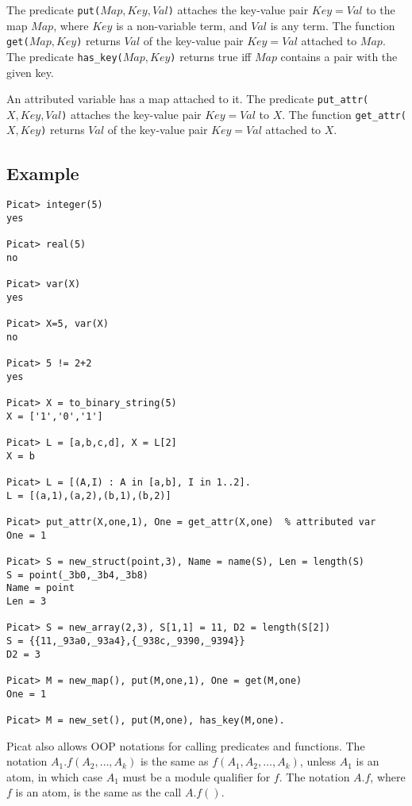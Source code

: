 The predicate \texttt{put($Map,Key,Val$)} attaches the key-value pair \texttt{$Key$$=$$Val$} to the map \texttt{$Map$}, where \texttt{$Key$} is a non-variable term, and \texttt{$Val$} is any term. The function \texttt{get($Map,Key$)} returns \texttt{$Val$} of the key-value pair \texttt{$Key$$=$$Val$} attached to \texttt{$Map$}. The predicate \texttt{has\_key($Map,Key$)} returns true iff $Map$ contains a pair with the given key.

An attributed variable has a map attached to it. The predicate \texttt{put\_attr($X,Key,Val$)} attaches the key-value pair \texttt{$Key$$=$$Val$} to \texttt{$X$}. The function \texttt{get\_attr($X,Key$)} returns \texttt{$Val$} of the key-value pair \texttt{$Key$$=$$Val$} attached to \texttt{$X$}. 

\subsection*{Example}
\begin{verbatim}
Picat> integer(5)
yes

Picat> real(5)
no

Picat> var(X)
yes

Picat> X=5, var(X)
no

Picat> 5 != 2+2
yes

Picat> X = to_binary_string(5)
X = ['1','0','1']

Picat> L = [a,b,c,d], X = L[2]
X = b

Picat> L = [(A,I) : A in [a,b], I in 1..2].
L = [(a,1),(a,2),(b,1),(b,2)]

Picat> put_attr(X,one,1), One = get_attr(X,one)  % attributed var
One = 1

Picat> S = new_struct(point,3), Name = name(S), Len = length(S)
S = point(_3b0,_3b4,_3b8)
Name = point
Len = 3

Picat> S = new_array(2,3), S[1,1] = 11, D2 = length(S[2])
S = {{11,_93a0,_93a4},{_938c,_9390,_9394}}
D2 = 3

Picat> M = new_map(), put(M,one,1), One = get(M,one)
One = 1

Picat> M = new_set(), put(M,one), has_key(M,one).
\end{verbatim}

Picat also allows OOP notations for calling predicates and functions. The notation \texttt{$A_1.f(A_2,\ldots,A_k)$} is the same as \texttt{$f(A_1,A_2,\ldots,A_k)$}, unless $A_1$ is an atom, in which case $A_1$ must be a module qualifier for $f$.  The notation $A.f$, where $f$ is an atom, is the same as the call \texttt{$A.f()$}. 

